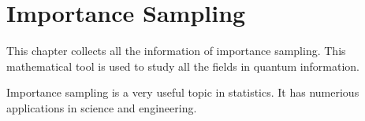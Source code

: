 \documentclass[../../note.tex]{subfiles}
\begin{document}
\chapter{Importance Sampling}
This chapter collects all the information of importance sampling. This mathematical tool is used to study all the fields in quantum information.

Importance sampling is a very useful topic in statistics. It has numerious applications in science and engineering.
\end{document}
